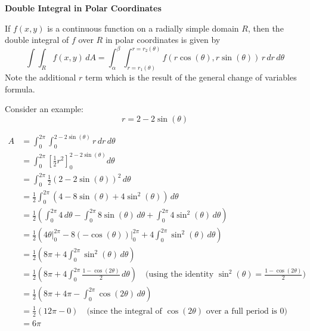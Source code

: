 \documentclass{article}
\newenvironment{definition}[1]{
    \par\noindent\textbf{#1}\par\noindent
}{
    \par \vspace{0.5cm}
}
\begin{document}
\vspace{0.5cm}

\begin{definition}{Double Integral in Polar Coordinates}
    If \( f(x, y) \) is a continuous function on a radially simple domain \( R \), then the double integral of \( f \) over \( R \) in polar coordinates is given by
    \[\int \int_{R} f(x, y) \, dA = \int_{\alpha}^{\beta} \int_{r = r_1(\theta)}^{r = r_2(\theta)} f(r \cos(\theta), r \sin(\theta)) \, r \, dr \, d\theta \]
    Note the additional \(r\) term which is the result of the general change of variables formula.
\end{definition}

Consider an example: \[r = 2 - 2\sin(\theta)\]

\begin{align*}
  A &= \int_{0}^{2\pi} \int_{0}^{2 - 2\sin(\theta)} r \, dr \, d\theta \\
    &= \int_{0}^{2\pi} \left[ \frac{1}{2} r^2 \right]_{0}^{2 - 2\sin(\theta)} d\theta \\
    &= \int_{0}^{2\pi} \frac{1}{2} (2 - 2\sin(\theta))^2 \, d\theta \\
    &= \frac{1}{2} \int_{0}^{2\pi} (4 - 8\sin(\theta) + 4\sin^2(\theta)) \, d\theta \\
    &= \frac{1}{2} \left( \int_{0}^{2\pi} 4 \, d\theta - \int_{0}^{2\pi} 8\sin(\theta) \, d\theta + \int_{0}^{2\pi} 4\sin^2(\theta) \, d\theta \right) \\
    &= \frac{1}{2} \left( 4\theta \Big|_{0}^{2\pi} - 8(-\cos(\theta)) \Big|_{0}^{2\pi} + 4 \int_{0}^{2\pi} \sin^2(\theta) \, d\theta \right) \\
    &= \frac{1}{2} \left( 8\pi + 4 \int_{0}^{2\pi} \sin^2(\theta) \, d\theta \right) \\
    &= \frac{1}{2} \left( 8\pi + 4 \int_{0}^{2\pi} \frac{1 - \cos(2\theta)}{2} \, d\theta \right) \quad \text{(using the identity $\sin^2(\theta) = \frac{1 - \cos(2\theta)}{2}$)} \\
    &= \frac{1}{2} \left( 8\pi + 4\pi - \int_{0}^{2\pi} \cos(2\theta) \, d\theta \right) \\
    &= \frac{1}{2} \left( 12\pi - 0 \right) \quad \text{(since the integral of $\cos(2\theta)$ over a full period is 0)} \\
    &= 6\pi
\end{align*}
\end{document}
